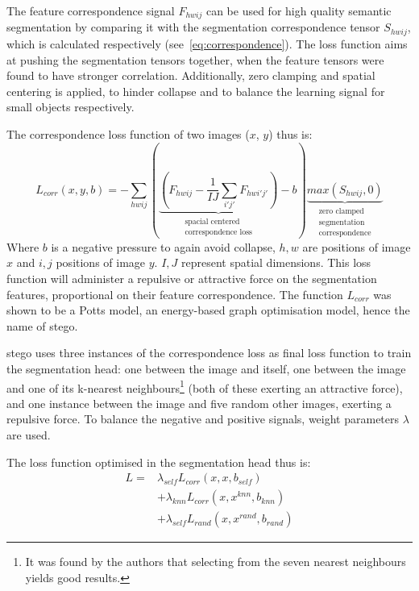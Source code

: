 The feature correspondence signal $F_{hwij}$ can be used for high quality semantic segmentation by comparing it with the segmentation correspondence tensor $S_{hwij}$, which is calculated respectively (see~\autoref{eq:correspondence}).
The loss function aims at pushing the segmentation tensors together, when the feature tensors were found to have stronger correlation.
Additionally, zero clamping and spatial centering is applied, to hinder collapse and to balance the learning signal for small objects respectively.~\autocite{Hamilton2022}

The correspondence loss function of two images ($x$, $y$) thus is:
\begin{equation}
    L_{corr}(x,y,b) = -\sum_{hwij}\left(\underbrace{\left(F_{hwij} -\frac{1}{IJ} \sum_{i'j'}F_{hwi'j'}\right)}_{\substack{\text{spacial centered} \\ \text{correspondence loss}}}- b\right) {} \underbrace{max(S_{hwij}, 0)}_{\substack{\text{zero clamped}\\\text{segmentation} \\ \text{correspondence}}}
    \label{eq:corr-loss}
\end{equation}
Where $b$ is a negative pressure to again avoid collapse, $h,w$ are positions of image $x$ and $i,j$ positions of image $y$.
$I,J$ represent spatial dimensions.
This loss function will administer a repulsive or attractive force on the segmentation features, proportional on their feature correspondence.
The function $L_{corr}$ was shown to be a Potts model, an energy-based graph optimisation model, hence the name of \gls{stego}.~\autocite{Hamilton2022}

\gls{stego} uses three instances of the correspondence loss as final loss function to train the segmentation head: one between the image and itself, one between the image and one of its k-nearest neighbours\footnote{It was found by the authors that selecting from the seven nearest neighbours yields good results.} (both of these exerting an attractive force), and one instance between the image and five random other images, exerting a repulsive force.
To balance the negative and positive signals, weight parameters $\lambda$ are used.~\autocite{Hamilton2022}

The loss function optimised in the segmentation head thus is:
\begin{equation}
\begin{aligned}    
    L = {} & \lambda_{self}L_{corr}(x,x,b_{self}) \\
        & + \lambda_{knn}L_{corr}(x,x^{knn},b_{knn}) \\
        & + \lambda_{self}L_{rand}(x,x^{rand},b_{rand})
    \label{eq:stego-loss}
\end{aligned}
\end{equation}

